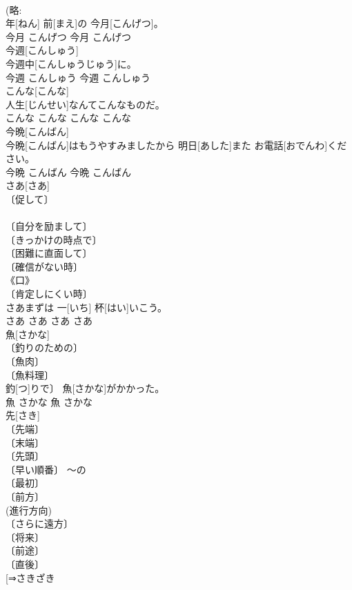 \documentclass[8pt]{extreport}
\begin{document}
\begin{CJK}{UTF8}{min}
\\	(略: 
\\	年[ねん] 前[まえ]の 今月[こんげつ]。	
\\	今月	こんげつ	今月	こんげつ	
\\	今週[こんしゅう]	
\\	今週中[こんしゅうじゅう]に。	
\\	今週	こんしゅう	今週	こんしゅう	
\\	こんな[こんな]	
\\	人生[じんせい]なんてこんなものだ。	
\\	こんな	こんな	こんな	こんな	
\\	今晩[こんばん]	
\\	今晩[こんばん]はもうやすみましたから 明日[あした]また お電話[おでんわ]ください。	
\\	今晩	こんばん	今晩	こんばん	
\\	さあ[さあ]	
\\	〔促して〕 
\\	[⇒さあさあ] 
\\	〔自分を励まして〕 
\\	〔きっかけの時点で〕 
\\	〔困難に直面して〕 
\\	〔確信がない時〕 
\\	《口》 
\\	〔肯定しにくい時〕 
\\	さあまずは 一[いち] 杯[はい]いこう。	
\\	さあ	さあ	さあ	さあ	
\\	魚[さかな]	
\\	〔釣りのための〕 
\\	〔魚肉〕 
\\	〔魚料理〕 
\\	釣[つ]りで〕 魚[さかな]がかかった。	
\\	魚	さかな	魚	さかな	
\\	先[さき]	
\\	〔先端〕 
\\	〔末端〕 
\\	〔先頭〕 
\\	〔早い順番〕 ～の 
\\	〔最初〕 
\\	〔前方〕 
\\	(進行方向) 
\\	〔さらに遠方〕 
\\	〔将来〕 
\\	〔前途〕 
\\	〔直後〕 
\\	[⇒さきざき 

\end{CJK}
\end{document}
